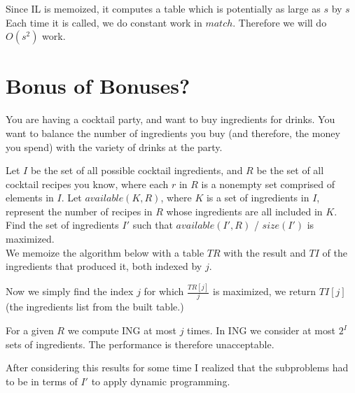 \documentclass{amsart}
\theoremstyle{definition}
\theoremstyle{remark}
\numberwithin{equation}{section}
\begin{document}
Since IL is memoized, it computes a table which is potentially as large as $s$ by $s$ Each time it is called, we do constant work in $match$. Therefore we will do $O(s^2)$ work.

\section{Bonus of Bonuses?}
You are having a cocktail party, and want to buy ingredients for drinks. You want to balance the number of ingredients you buy (and therefore, the money you spend) with the variety of drinks at the party.
 
Let $I$ be the set of all possible cocktail ingredients, and $R$ be the set of all cocktail recipes you know, where each $r$ in $R$ is a nonempty set comprised of elements in $I$. Let $available(K,R)$, where $K$ is a set of ingredients in $I$, represent the number of recipes in $R$ whose ingredients are all included in $K$. Find the set of ingredients $I'$ such that $available(I',R)$ / $size(I')$ is maximized. \\

We memoize the algorithm below with a table $TR$ with the result and $TI$ of the ingredients that produced it, both indexed by $j$.
\begin{algorithm}




  \EndFunction
\end{algorithm}

Now we simply find the index $j$ for which $\frac{TR[j]}{j}$ is maximized, we return $TI[j]$ (the ingredients list from the built table.)

For a given $R$ we compute ING at most $j$ times. In ING we consider at most $2^I$ sets of ingredients. The performance is therefore unacceptable.

After considering this results for some time I realized that the subproblems had to be in terms of $I'$ to apply dynamic programming.
\end{document}
